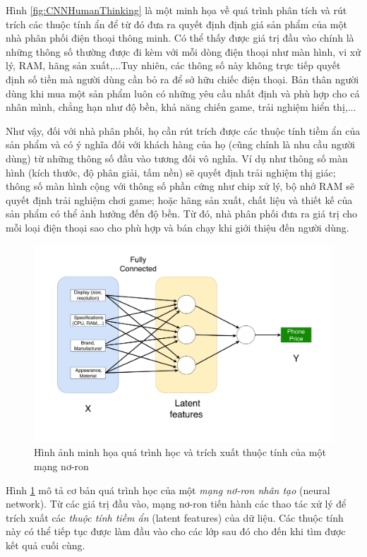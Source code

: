 Hình \ref{fig:CNNHumanThinking} là một minh họa về quá trình phân tích và rút trích các thuộc tính ẩn để từ đó đưa ra quyết định định giá sản phẩm của một nhà phân phối điện thoại thông minh. Có thể thấy được giá trị đầu vào chính là những thông số thường được đi kèm với mỗi dòng điện thoại như màn hình, vi xử lý, RAM, hãng sản xuất,...Tuy nhiên, các thông số này không trực tiếp quyết định số tiền mà người dùng cần bỏ ra để sở hữu chiếc điện thoại. Bản thân người dùng khi mua một sản phẩm luôn có những yêu cầu nhất định và phù hợp cho cá nhân mình, chẳng hạn như độ bền, khả năng chiến game, trải nghiệm hiển thị,...

Như vậy, đối với nhà phân phối, họ cần rút trích được các thuộc tính tiềm ẩn của sản phẩm và có ý nghĩa đối với khách hàng của họ (cũng chính là nhu cầu người dùng) từ những thông số đầu vào tương đối vô nghĩa. Ví dụ như thông số màn hình (kích thước, độ phân giải, tấm nền) sẽ quyết định trải nghiệm thị giác; thông số màn hình cộng với thông số phần cứng như chip xử lý, bộ nhớ RAM sẽ quyết định trải nghiệm chơi game; hoặc hãng sản xuất, chất liệu và thiết kế của sản phẩm có thể ảnh hưởng đến độ bền. Từ đó, nhà phân phối đưa ra giá trị cho mỗi loại điện thoại sao cho phù hợp và bán chạy khi giới thiệu đến người dùng.


\begin{figure}[!h]
	\centering
		\includegraphics[width=1.0\columnwidth]{chapter05/figure/CNN_machine_learning.png}
		\centering
	\caption{Hình ảnh minh họa quá trình học và trích xuất thuộc tính của một mạng nơ-ron}
	\label{fig:CNNMachineLearning}
\end{figure}

Hình \ref{fig:CNNMachineLearning} mô tả cơ bản quá trình học của một \textit{mạng nơ-ron nhân tạo} (neural network). Từ các giá trị đầu vào, mạng nơ-ron tiến hành các thao tác xử lý để trích xuất các \textit{thuộc tính tiềm ẩn} (latent features) của dữ liệu. Các thuộc tính này có thể tiếp tục được làm đầu vào cho các lớp sau đó cho đến khi tìm được kết quả cuối cùng.

